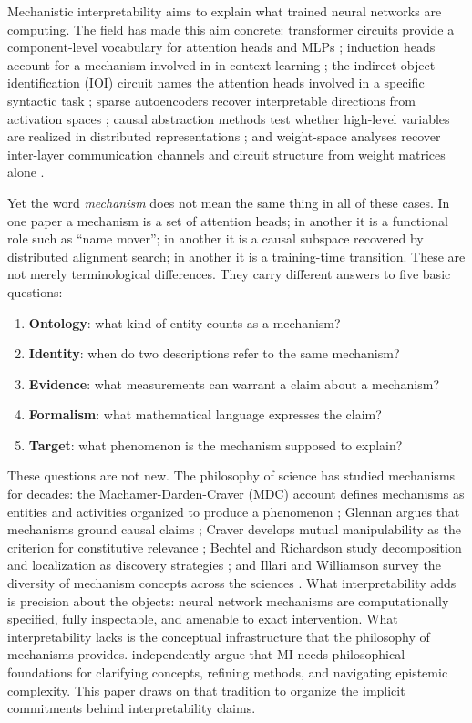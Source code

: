 \documentclass{article}
\begin{document}
Mechanistic interpretability aims to explain what trained neural
networks are computing.  The field has made this aim concrete:
transformer circuits provide a component-level vocabulary for attention
heads and MLPs \citep{elhage2021}; induction heads account for a
mechanism involved in in-context learning \citep{olsson2022}; the
indirect object identification (IOI) circuit names the attention heads
involved in a specific syntactic task \citep{wang2022}; sparse
autoencoders recover interpretable directions from activation spaces
\citep{bricken2023,templeton2024}; causal abstraction methods test
whether high-level variables are realized in distributed representations
\citep{geiger2021,geiger2024}; and weight-space analyses recover
inter-layer communication channels and circuit structure from weight
matrices alone \citep{merullo2024,elhage2021}.

Yet the word \emph{mechanism} does not mean the same thing in all of
these cases.  In one paper a mechanism is a set of attention heads;
in another it is a functional role such as ``name mover''; in another
it is a causal subspace recovered by distributed alignment search; in
another it is a training-time transition.  These are not merely
terminological differences.  They carry different answers to five basic
questions:
\begin{enumerate}[leftmargin=*,label=(\arabic*)]
\item \textbf{Ontology}: what kind of entity counts as a mechanism?
\item \textbf{Identity}: when do two descriptions refer to the same mechanism?
\item \textbf{Evidence}: what measurements can warrant a claim about a mechanism?
\item \textbf{Formalism}: what mathematical language expresses the claim?
\item \textbf{Target}: what phenomenon is the mechanism supposed to explain?
\end{enumerate}
These questions are not new.  The philosophy of science has studied
mechanisms for decades: the Machamer-Darden-Craver (MDC) account defines
mechanisms as entities and activities organized to produce a phenomenon
\citep{machamer2000}; Glennan argues that mechanisms ground causal claims
\citep{glennan1996}; Craver develops mutual manipulability as the
criterion for constitutive relevance \citep{craver2007}; Bechtel and
Richardson study decomposition and localization as discovery strategies
\citep{bechtel1993}; and Illari and Williamson survey the diversity of
mechanism concepts across the sciences \citep{illari2012}.  What
interpretability adds is precision about the objects: neural network
mechanisms are computationally specified, fully inspectable, and amenable
to exact intervention.  What interpretability lacks is the conceptual
infrastructure that the philosophy of mechanisms provides.
\citet{williams2025} independently argue that MI needs philosophical
foundations for clarifying concepts, refining methods, and navigating
epistemic complexity.  This paper draws on that tradition to organize
the implicit commitments behind interpretability claims.
\end{document}

